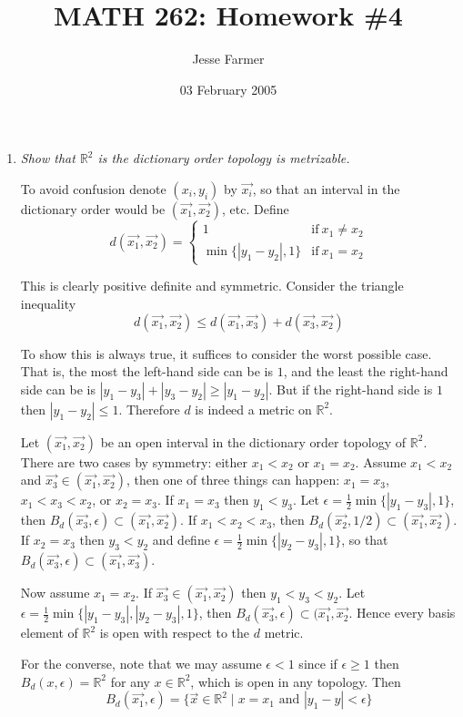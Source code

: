 \documentclass[10pt]{article}
\title{MATH 262: Homework \#4}
\author{Jesse Farmer}
\date{03 February 2005}
\newcommand{\R}{\mathbb{R}}
\begin{document}
\maketitle
\begin{enumerate}
\item \emph{Show that $\R^2$ is the dictionary order topology is metrizable.}

To avoid confusion denote $(x_i, y_i)$ by $\vec{x_i}$, so that an interval in the dictionary order would be $(\vec{x_1}, \vec{x_2})$, etc.  Define $$d(\vec{x_1}, \vec{x_2}) = \begin{cases} 1 & \mbox{if}~x_1 \neq x_2 \\ \min\{|y_1-y_2|, 1\} & \mbox{if}~x_1 = x_2 \end{cases}$$

This is clearly positive definite and symmetric.  Consider the triangle inequality
\[
d(\vec{x_1},\vec{x_2}) \leq d(\vec{x_1}, \vec{x_3}) + d(\vec{x_3}, \vec{x_2})
\]

To show this is always true, it suffices to consider the worst possible case.  That is, the most the left-hand side can be is $1$, and the least the right-hand side can be is $|y_1 - y_3| + |y_3 - y_2| \geq |y_1 - y_2|$.  But if the right-hand side is $1$ then $|y_1 - y_2| \leq 1$.  Therefore $d$ is indeed a metric on $\R^2$.

Let $(\vec{x_1}, \vec{x_2})$ be an open interval in the dictionary order topology of $\R^2$.  There are two cases by symmetry: either $x_1 < x_2$ or $x_1 = x_2$.  Assume $x_1 < x_2$ and $\vec{x_3} \in (\vec{x_1}, \vec{x_2})$, then one of three things can happen: $x_1 = x_3$, $x_1 < x_3 < x_2$, or $x_2 = x_3$.  If $x_1 = x_3$ then $y_1 < y_3$.  Let $\epsilon = \frac{1}{2} \min\{|y_1 - y_3|, 1\}$, then $B_d(\vec{x_3}, \epsilon) \subset (\vec{x_1}, \vec{x_2})$.  If $x_1 < x_2 < x_3$, then $B_d(\vec{x_2}, 1/2) \subset (\vec{x_1}, \vec{x_2})$.  If $x_2 = x_3$ then $y_3 < y_2$ and define $\epsilon = \frac{1}{2} \min\{|y_2 - y_3|, 1\}$, so that $B_d(\vec{x_3}, \epsilon) \subset (\vec{x_1}, \vec{x_3})$.

Now assume $x_1 = x_2$.  If $\vec{x_3} \in (\vec{x_1}, \vec{x_2})$ then $y_1 < y_3 < y_2$.  Let $\epsilon = \frac{1}{2}\min\{|y_1 - y_3|, |y_2 - y_3|, 1\}$, then $B_d(\vec{x_3}, \epsilon) \subset (\vec{x_1}, \vec{x_2}$.  Hence every basis element of $\R^2$ is open with respect to the $d$ metric.

For the converse, note that we may assume $\epsilon < 1$ since if $\epsilon \geq 1$ then $B_d(x, \epsilon) = \R^2$ for any $x \in \R^2$, which is open in any topology.  Then $$B_d(\vec{x_1}, \epsilon) = \{\vec{x} \in \R^2 \mid x = x_1 \mbox{ and } |y_1 - y| < \epsilon\}$$


\end{enumerate}
\end{document}
